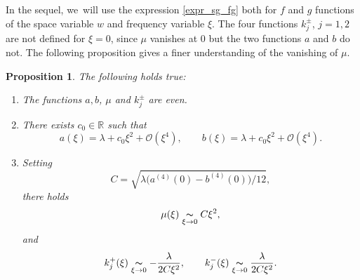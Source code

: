 \documentclass[JEP,XML,SOM,Unicode,NoFloatCountersInSection,published]{cedram}
\newtheorem{prop}[theorem]{Proposition}
\theoremstyle{definition}
\newcommand\R{\mathbb R}
\newcommand{\simx}[2]{\underset{#1\to#2}{\thicksim}}
\begin{document}
In the sequel, we~will use the expression \eqref{expr_sg_fg} both for $f$ and $g$ functions of the space variable $w$ and frequency variable $\xi$.
The four functions $k_j^\pm$, $j=1,2$ are not defined for $\xi=0$, since $\mu$ vanishes at $0$ but the two functions $a$ and $b$ do not. The following proposition gives a finer understanding of the vanishing of $\mu$.

\begin{prop}\label{prop_equiv_mu}
The following holds true:
\begin{enumerate}
\item The functions $a,b$, $\mu$ and $k_j^\pm$ are even.
\item There exists $c_0 \in \R$ such that
\[
a(\xi)= \lambda +c_0 \xi^2+ \mathcal{O}(\xi^4), \qquad b(\xi)= \lambda +c_0 \xi^2+ \mathcal{O}(\xi^4).
\]
\item Setting
\[
C = \sqrt{{\lambda}\bigl(a^{(4)}(0)-b^{(4)}(0)\bigr)/12},
\]
there holds
\begin{equation}\label{equiv_mu}
\mu(\xi) \simx{\xi}{0} C\xi^2,
\end{equation}
and
\begin{equation}\label{equiv_fcts_k}
k_j^+(\xi) \simx{\xi}{0} -\frac{\lambda}{2C\xi^2}, \qquad k_j^-(\xi) \simx{\xi}{0} \frac{\lambda}{2C\xi^2}.
\end{equation}
\end{enumerate}
\end{prop}
\end{document}
